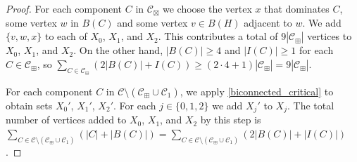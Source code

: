 \documentclass[12pt]{article}
\theoremstyle{definition}
\newcommand{\pat}[1]{[\textcolor{red}{PM: #1}]}
\begin{document}
\begin{proof}




  For each component $C$ in $\mathcal{C}_{\boxtimes}$ we choose the vertex $x$ that dominates $C$, some vertex $w$ in $B(C)$ and some vertex $v\in B(H)$ adjacent to $w$.  We add $\{v,w,x\}$ to each of $X_0$, $X_1$, and $X_2$.  This contributes a total of $9|\mathcal{C}_{\boxplus}|$ vertices to $X_0$, $X_1$, and $X_2$. On the other hand, $|B(C)|\ge 4$ and $|I(C)|\ge 1$ for each $C\in \mathcal{C}_{\boxplus}$, so
  $\sum_{C\in \mathcal{C}_{\boxplus}} (2|B(C)| + I(C))\ge (2\cdot 4+1)|\mathcal{C}_{\boxplus}| = 9|\mathcal{C}_{\boxplus}|$.

  For each component $C$ in $\mathcal{C}\setminus(\mathcal{C}_{\boxplus}\cup\mathcal{C}_1)$, we apply \cref{biconnected_critical} to obtain sets $X_0'$, $X_1'$, $X_2'$.
  For each $j\in\{0,1,2\}$ we add $X_j'$ to $X_j$.  The total number of vertices added to $X_0$, $X_1$, and $X_2$ by this step is $\sum_{C\in\mathcal{C}\setminus(\mathcal{C}_{\boxplus}\cup\mathcal{C}_1)}(|C|+|B(C)|)=\sum_{C\in\mathcal{C}\setminus(\mathcal{C}_{\boxplus}\cup\mathcal{C}_1)}(2|B(C)|+|I(C)|)$.


\end{proof}
\end{document}
